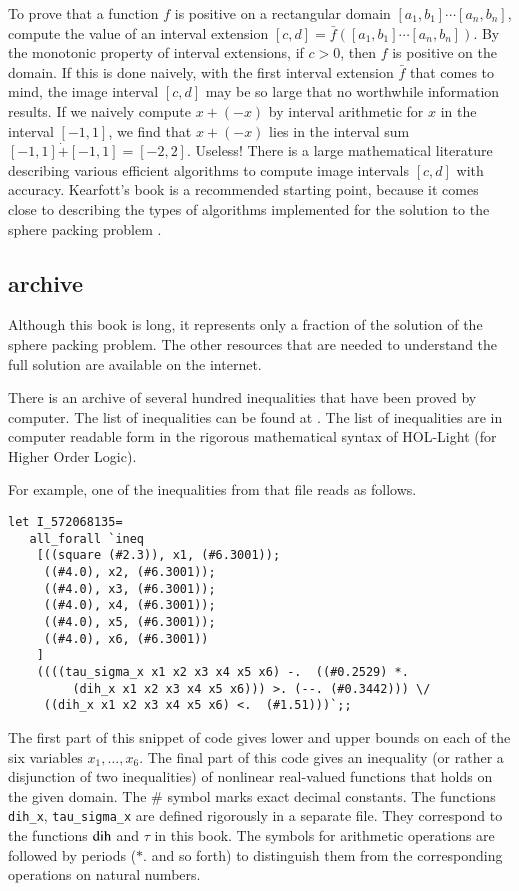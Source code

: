 To prove that a function $f$ is positive on a rectangular domain
$[a_1,b_1]\cdots[a_n,b_n]$, compute the
value of an interval extension $[c,d]=\bar f([a_1,b_1]\cdots[a_n,b_n])$.
By the monotonic property of interval extensions, if $c>0$, then $f$
is positive on the domain.  If this is done naively, with the
first interval extension $\bar f$ that comes to mind, the image interval
$[c,d]$ may be so large that no worthwhile information results.
If we naively 
compute $x+(-x)$ by interval arithmetic for $x$ in the interval $[-1,1]$,
we find that $x+(-x)$ lies in the interval sum
$[-1,1]\dot + [-1,1] = [-2,2]$.  Useless!
There is a large mathematical literature describing various 
efficient algorithms
to compute image intervals $[c,d]$ with accuracy.
Kearfott's book is a recommended starting point, because it comes
close to describing the types of algorithms implemented for the
solution to the sphere packing problem \cite{Kea96}. 



\subsection{archive}

Although this book is long,  it represents only a fraction of the solution of
the sphere packing problem.  The other resources that are needed to understand
the full solution are available on the internet.

There is an archive of  several hundred
inequalities that have been proved by computer.  The list of inequalities can
be found at \cite{web}.    
The list of inequalities are in computer readable
form in the rigorous mathematical syntax of HOL-Light (for Higher Order Logic).

For example, one of the inequalities from that file reads as follows.
\begin{verbatim}
let I_572068135=
   all_forall `ineq 
    [((square (#2.3)), x1, (#6.3001));
     ((#4.0), x2, (#6.3001));
     ((#4.0), x3, (#6.3001));
     ((#4.0), x4, (#6.3001));
     ((#4.0), x5, (#6.3001));
     ((#4.0), x6, (#6.3001))
    ]
    ((((tau_sigma_x x1 x2 x3 x4 x5 x6) -.  ((#0.2529) *.  
         (dih_x x1 x2 x3 x4 x5 x6))) >. (--. (#0.3442))) \/ 
     ((dih_x x1 x2 x3 x4 x5 x6) <.  (#1.51)))`;;
\end{verbatim}
The first part of this snippet of code gives lower and upper bounds on each of the six variables $x_1,\ldots,x_6$.  The final part of this code gives an inequality (or rather a disjunction of two inequalities) of nonlinear real-valued functions that holds on the given domain.
The $\#$ symbol marks exact decimal constants.  The functions {\tt dih\_x}, {\tt tau\_sigma\_x} are defined rigorously in a separate file.  They correspond to the functions 
$\operatorname{dih}$ and $\tau$ in this book.  The symbols for arithmetic operations are followed by periods ($*.$ and so forth) to distinguish them from the corresponding operations on natural numbers.  

